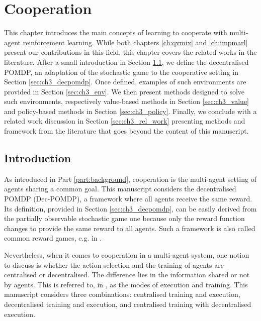 \chapter{Cooperation}\label{ch:cooperation}
\begin{chapter_outline}

This chapter introduces the main concepts of learning to cooperate with multi-agent reinforcement learning.
While both chapters \ref{ch:qvmix} and \ref{ch:impmarl} present our contributions in this field, this chapter covers the related works in the literature.
After a small introduction in Section \ref{sec:ch3_intro}, we define the decentralised POMDP, an adaptation of the stochastic game to the cooperative setting in Section \ref{sec:ch3_decpomdp}.
Once defined, examples of such environments are provided in Section \ref{sec:ch3_env}.
We then present methods designed to solve such environments, respectively value-based methods in Section \ref{sec:ch3_value} and policy-based methods in Section \ref{sec:ch3_policy}.
Finally, we conclude with a related work discussion in Section \ref{sec:ch3_rel_work} presenting methods and framework from the literature that goes beyond the content of this manuscript.

\end{chapter_outline}


\section{Introduction}
\label{sec:ch3_intro}
As introduced in Part \ref{part:background}, cooperation is the multi-agent setting of agents sharing a common goal.
This manuscript considers the decentralised POMDP (Dec-POMDP), a framework where all agents receive the same reward.
Its definition, provided in Section \ref{sec:ch3_decpomdp}, can be easily derived from the partially observable stochastic game one because only the reward function changes to provide the same reward to all agents.
Such a framework is also called common reward games, e.g. in \cite{marl-book}.


Nevertheless, when it comes to cooperation in a multi-agent system, one notion to discuss is whether the action selection and the training of agents are centralised or decentralised.
The difference lies in the information shared or not by agents.
This is referred to, in \citep{marl-book}, as the modes of execution and training.
This manuscript considers three combinations: centralised training and execution, decentralised training and execution, and centralised training with decentralised execution.

